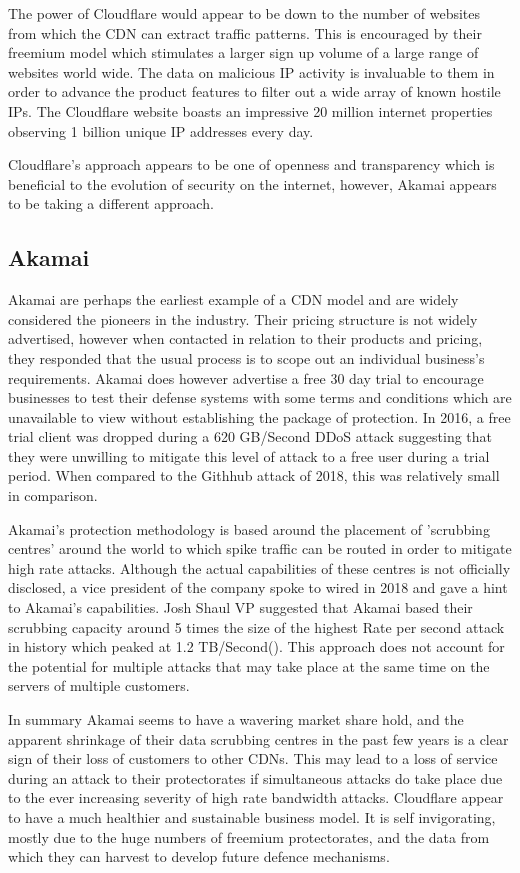 The power of Cloudflare would appear to be down to the number of websites from which the CDN can extract traffic patterns. This is encouraged by their freemium model which stimulates a larger sign up volume of a large range of websites world wide. The data on malicious IP activity is invaluable to them in order to advance the product features to filter out a wide array of known hostile IPs. The Cloudflare website boasts an impressive 20 million internet properties observing 1 billion unique IP addresses every day.

Cloudflare's approach appears to be one of openness and transparency which is beneficial to the evolution of security on the internet, however, Akamai appears to be taking a different approach. 
\subsection{Akamai}
Akamai are perhaps the earliest example of a CDN model and are widely considered the pioneers in the industry. Their pricing structure is not widely advertised, however when contacted in relation to their products and pricing, they responded that the usual process is to scope out an individual business's requirements.\cite{akamai} Akamai does however advertise a free 30 day trial to encourage businesses to test their defense systems with some terms and conditions which are unavailable to view without establishing the package of protection. In 2016, a free trial client was dropped during a 620 GB/Second DDoS attack suggesting that they were unwilling to mitigate this level of attack to a free user during a trial period. When compared to the Githhub attack of 2018, this was relatively small in comparison.

Akamai's protection methodology is based around the placement of 'scrubbing centres' around the world to which spike traffic can be routed in order to mitigate high rate attacks. Although the actual capabilities of these centres is not officially disclosed, a vice president of the company spoke to wired in 2018 and gave a hint to Akamai's capabilities. Josh Shaul VP suggested that Akamai based their scrubbing capacity around 5 times the size of the highest Rate per second attack in history which peaked at 1.2 TB/Second(\cite{github}). This approach does not account for the potential for multiple attacks that may take place at the same time on the servers of multiple customers.

In summary Akamai seems to have a wavering market share hold, and the apparent shrinkage of their data scrubbing centres in the past few years is a clear sign of their loss of customers to other CDNs. This may lead to a loss of service during an attack to their protectorates if simultaneous attacks do take place due to the ever increasing severity of high rate bandwidth attacks. Cloudflare appear to have a much healthier and sustainable business model. It is self invigorating, mostly due to the huge numbers of freemium protectorates, and the data from which they can harvest to develop future defence mechanisms. 